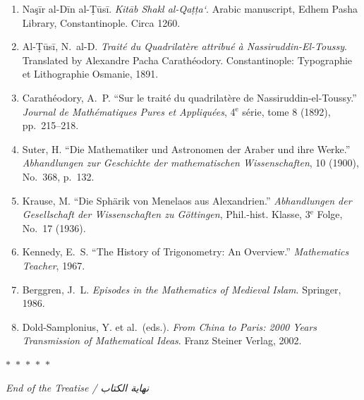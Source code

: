 \documentclass[11pt,a4paper]{article}
\theoremstyle{plain}
\theoremstyle{definition}
\theoremstyle{remark}
\newcommand{\ar}[1]{{\arabicfont\beginR #1\endR}}
\newcommand{\dblornament}{\begin{center}\textcolor{goldaccent}{$\ast$~$\ast$~$\ast$~$\ast$~$\ast$}\end{center}}
\begin{document}
\begin{enumerate}
\item Na\c{s}\=ir al-D\=in al-\d{T}\=us\=i. \textit{Kit\=ab Shakl al-Qa\d{t}\d{t}a`}. Arabic manuscript, Edhem Pasha Library, Constantinople. Circa 1260.

\item Al-\d{T}\=us\=i, N.~al-D. \textit{Trait\'e du Quadrilat\`ere attribu\'e \`a Nassiruddin-El-Toussy}. Translated by Alexandre Pacha Carath\'eodory. Constantinople: Typographie et Lithographie Osmanie, 1891.

\item Carath\'eodory, A.~P. ``Sur le trait\'e du quadrilat\`ere de Nassiruddin-el-Toussy.'' \textit{Journal de Math\'ematiques Pures et Appliqu\'ees}, 4$^{\text{e}}$ s\'erie, tome 8 (1892), pp.~215--218.

\item Suter, H. ``Die Mathematiker und Astronomen der Araber und ihre Werke.'' \textit{Abhandlungen zur Geschichte der mathematischen Wissenschaften}, 10 (1900), No.~368, p.~132.

\item Krause, M. ``Die Sph\"arik von Menelaos aus Alexandrien.'' \textit{Abhandlungen der Gesellschaft der Wissenschaften zu G\"ottingen}, Phil.-hist. Klasse, 3$^{\text{e}}$ Folge, No.~17 (1936).

\item Kennedy, E.~S. ``The History of Trigonometry: An Overview.'' \textit{Mathematics Teacher}, 1967.

\item Berggren, J.~L. \textit{Episodes in the Mathematics of Medieval Islam}. Springer, 1986.

\item Dold-Samplonius, Y. et al.~(eds.). \textit{From China to Paris: 2000 Years Transmission of Mathematical Ideas}. Franz Steiner Verlag, 2002.
\end{enumerate}

\vspace{1cm}
\begin{center}
\dblornament\vspace{0.5cm}
{\small\textit{End of the Treatise / \ar{نهاية الكتاب}}}\\[0.3cm]

\end{center}
\end{document}
